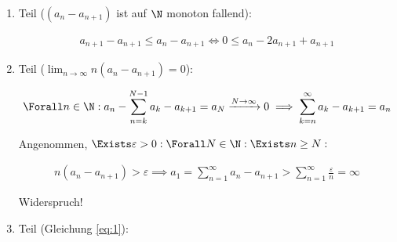 \begin{solution}

\phantom{}

\begin{enumerate}[label = \arabic*.]

    \item Teil ($(a_n - a_{n+1})$ ist auf $\N$ monoton fallend):

    \begin{align*}
        a_{n+1} - a_{n+1} \leq a_n - a_{n+1}
        \iff
        0 \leq a_n - 2 a_{n+1} + a_{n+1}
    \end{align*}

    \item Teil ($\lim_{n \to \infty} n (a_n - a_{n+1}) = 0$):

    \begin{align*}
        \Forall n \in \N:
        a_n - \sum_{n=k}^{N-1} a_k - a_{k+1}
        =
        a_N
        \xrightarrow{N \to \infty}
        0
        \implies
        \sum_{k=n}^\infty a_k - a_{k+1} = a_n
    \end{align*}

    Angenommen, $\Exists \varepsilon > 0: \Forall N \in \N: \Exists n \geq N:$

    \begin{align*}
        n (a_n - a_{n+1}) > \varepsilon
        \implies
        a_1
        =
        \sum_{n=1}^\infty
        a_n - a_{n+1}
        >
        \sum_{n=1}^\infty
        \frac{\varepsilon}{n}
        =
        \infty
    \end{align*}

    Widerspruch!

    \item Teil (Gleichung \eqref{eq:1}):


\end{enumerate}
\end{solution}
